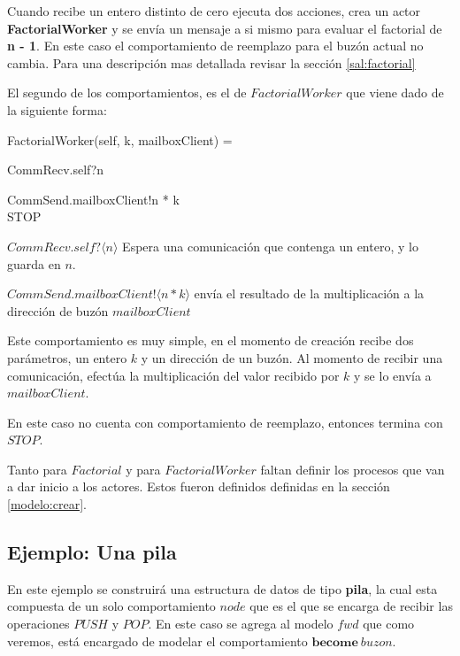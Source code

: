 Cuando recibe un entero distinto de cero ejecuta dos acciones, crea un actor \textbf{FactorialWorker} y se envía un mensaje a si mismo para evaluar el factorial de \textbf{n - 1}. En este caso el comportamiento de reemplazo para el buzón actual no cambia. Para una descripción mas detallada revisar la sección \ref{sal:factorial}

El segundo de los comportamientos, es el de $FactorialWorker$ que viene dado de la siguiente forma:

\begin{process}
FactorialWorker(self, k, mailboxClient) = {} \\ \quad
  \begin{block}
  CommRecv.self?\langle n \rangle \then {} \\ \quad
    \begin{block}
    CommSend.mailboxClient!\langle n * k \rangle \then \\
    STOP
    \end{block}
  \end{block}
\end{process}

\begin{description}
 \item $CommRecv.self?\langle n \rangle$ Espera una comunicación que contenga un entero, y lo guarda en $n$.
 \item $CommSend.mailboxClient!\langle n * k \rangle$ envía el resultado de la multiplicación a la dirección de buzón $mailboxClient$
\end{description}

Este comportamiento es muy simple, en el momento de creación recibe dos parámetros, un entero $k$ y un dirección de un buzón. Al momento de recibir una comunicación, efectúa la multiplicación del valor recibido por $k$ y se lo envía a $mailboxClient$.

En este caso no cuenta con comportamiento de reemplazo, entonces termina con $STOP$.

Tanto para $Factorial$ y para $FactorialWorker$ faltan definir los procesos que van a dar inicio a los actores. Estos fueron definidos definidas en la sección \ref{modelo:crear}. 

\subsection{Ejemplo: Una pila}
En este ejemplo se construirá una estructura de datos de tipo \textbf{pila}, la cual esta compuesta de un solo comportamiento $node$ que es el que se encarga de recibir las operaciones $PUSH$ y $POP$. En este caso se agrega al modelo $fwd$ que como veremos, está encargado de modelar el comportamiento $\textbf{become}\ buzon$.

